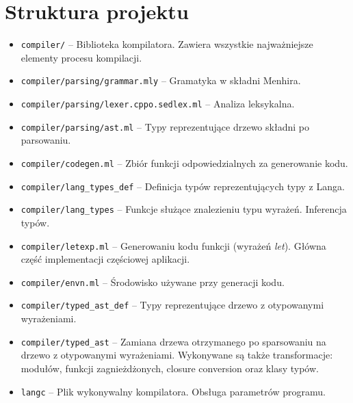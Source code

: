 \documentclass[declaration,shortabstract]{iithesis}
\begin{document}


\section{Struktura projektu}

\begin{itemize}
  \item \texttt{compiler/} -- Biblioteka kompilatora. Zawiera wszystkie 
  najważniejsze elementy procesu kompilacji.
  \item \texttt{compiler/parsing/grammar.mly} -- Gramatyka w składni Menhira.
  \item \texttt{compiler/parsing/lexer.cppo.sedlex.ml} -- Analiza leksykalna.
  \item \texttt{compiler/parsing/ast.ml} -- Typy reprezentujące drzewo składni 
  po parsowaniu.
  \item \texttt{compiler/codegen.ml} -- Zbiór funkcji odpowiedzialnych za 
  generowanie kodu.
  \item \texttt{compiler/lang\_types\_def} -- Definicja typów reprezentujących 
  typy z Langa.
  \item \texttt{compiler/lang\_types} -- Funkcje służące znalezieniu
  typu wyrażeń. Inferencja typów.
  \item \texttt{compiler/letexp.ml} -- Generowaniu kodu funkcji 
  (wyrażeń \textit{let}). 
  Główna część implementacji częściowej aplikacji.
  \item \texttt{compiler/envn.ml} -- Środowisko używane przy 
  generacji kodu.
  \item \texttt{compiler/typed\_ast\_def} -- Typy reprezentujące drzewo 
  z otypowanymi wyrażeniami.
  \item \texttt{compiler/typed\_ast} -- Zamiana drzewa otrzymanego po 
  sparsowaniu na \newline drzewo z otypowanymi wyrażeniami. Wykonywane są także 
  transformacje: modułów, funkcji zagnieżdżonych, closure conversion
  oraz klasy typów.
  \item \texttt{langc} -- Plik wykonywalny kompilatora. Obsługa 
  parametrów programu.

\end{itemize}
\end{document}
